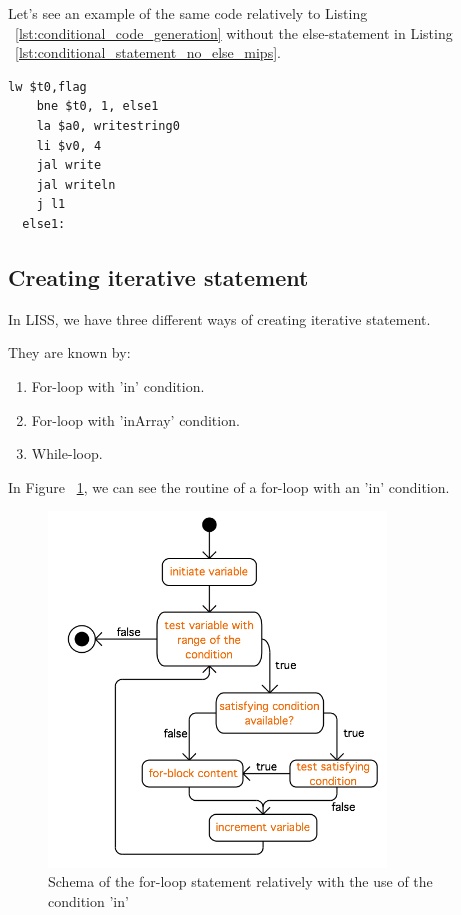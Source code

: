 \documentclass[
  oneside,
  11pt, a4paper,
  footinclude=true,
  headinclude=true,
  cleardoublepage=empty
]{scrbook}
\begin{document}
Let's see an example of the same code relatively to Listing ~\ref{lst:conditional_code_generation} without the else-statement in Listing ~\ref{lst:conditional_statement_no_else_mips}.

\begin{lstlisting}[caption={Code generated for conditional statements without an else-statement in MIPS},label={lst:conditional_statement_no_else_mips}]
    lw $t0,flag		
    bne $t0, 1, else1		
    la $a0, writestring0
    li $v0, 4
    jal write		
    jal writeln		
    j l1		
  else1:
\end{lstlisting}

\subsection{Creating iterative statement}

In LISS, we have three different ways of creating iterative statement. 

They are known by:

\begin{enumerate}
\item For-loop with 'in' condition.
\item For-loop with 'inArray' condition.
\item While-loop.
\end{enumerate}

In Figure ~\ref{fig:for-loop_in}, we can see the routine of a for-loop with an 'in' condition.

\begin{figure}[h!]
  \centering
    \includegraphics[width=0.8\textwidth]{img/for-loop_in.png}
    \caption{Schema of the for-loop statement relatively with the use of the condition 'in'}
    \label{fig:for-loop_in}
\end{figure}
\end{document}
